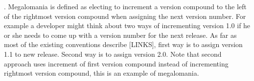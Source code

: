 \documentclass[conference]{IEEEtran}
\begin{document}
%
%


%

 
. Megalomania is defined as electing to increment a version compound to the left of the rightmost version compound when assigning the next version number.
For example a developer might think about two ways of incrementing version 1.0 if he or she needs to come up with a version number for the next release.
 As far as most of the existing conventions describe [LINKS], first way is to assign version 1.1 to new release. Second way is to assign version 2.0. Note that second approach uses increment of first version compound instead of incrementing rightmost version compound, this is an example of megalomania. 
\end{document}
